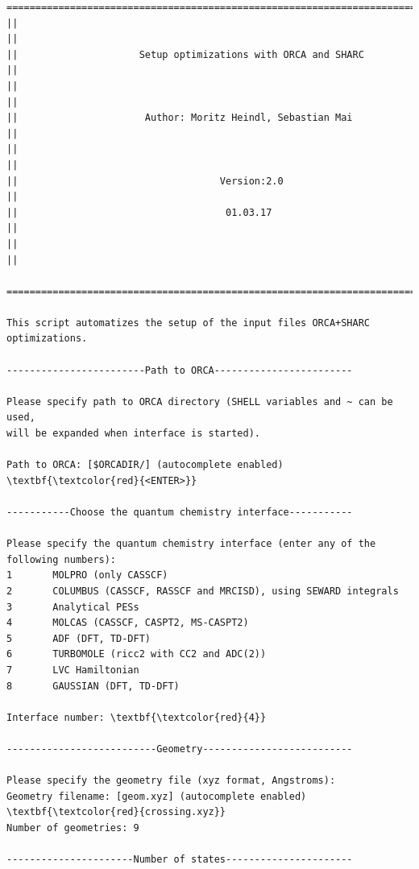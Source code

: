 \documentclass[a4paper,11pt,DIV=15,openany]{scrbook}
\begin{document}
\begin{oframed}
\footnotesize\begin{Verbatim}[commandchars=\\\{\}]
  ================================================================================
||                                                                                ||
||                     Setup optimizations with ORCA and SHARC                    ||
||                                                                                ||
||                      Author: Moritz Heindl, Sebastian Mai                      ||
||                                                                                ||
||                                   Version:2.0                                  ||
||                                    01.03.17                                    ||
||                                                                                ||
  ================================================================================

This script automatizes the setup of the input files ORCA+SHARC optimizations. 
  
------------------------Path to ORCA------------------------

Please specify path to ORCA directory (SHELL variables and ~ can be used, 
will be expanded when interface is started).

Path to ORCA: [$ORCADIR/] (autocomplete enabled) \textbf{\textcolor{red}{<ENTER>}}

-----------Choose the quantum chemistry interface-----------

Please specify the quantum chemistry interface (enter any of the following numbers):
1       MOLPRO (only CASSCF)
2       COLUMBUS (CASSCF, RASSCF and MRCISD), using SEWARD integrals
3       Analytical PESs
4       MOLCAS (CASSCF, CASPT2, MS-CASPT2)
5       ADF (DFT, TD-DFT)
6       TURBOMOLE (ricc2 with CC2 and ADC(2))
7       LVC Hamiltonian
8       GAUSSIAN (DFT, TD-DFT)

Interface number: \textbf{\textcolor{red}{4}}

--------------------------Geometry--------------------------

Please specify the geometry file (xyz format, Angstroms):
Geometry filename: [geom.xyz] (autocomplete enabled) \textbf{\textcolor{red}{crossing.xyz}}
Number of geometries: 9

----------------------Number of states----------------------



\end{Verbatim}
\end{oframed}
\end{document}

